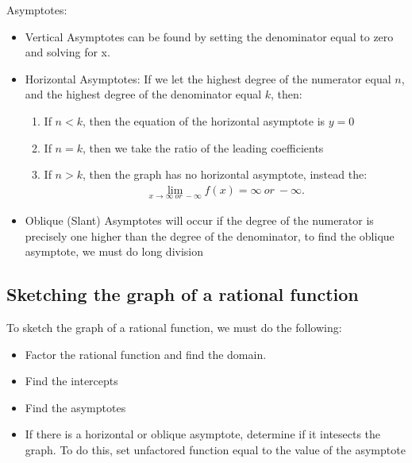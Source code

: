 \documentclass{report}
\begin{document}
    \bigbreak \noindent 
    Asymptotes:
    \begin{itemize}
      \item Vertical Asymptotes can be found by setting the denominator equal to zero and solving for x.
      \item Horizontal Asymptotes: If we let the highest degree of the numerator equal $n$, and the highest degree of the denominator equal $k$, then:
        \begin{enumerate}
          \item If $n < k$, then the equation of the horizontal asymptote is $y=0$
          \item If $n =k$, then we take the ratio of the leading coefficients
          \item If $n>k$, then the graph has no horizontal asymptote, instead the:
            \begin{align*}
               \lim\limits_{x \to \infty\ or\ -\infty}{f(x) = \infty\ or\ -\infty}
            .\end{align*}
        \end{enumerate}
      \item Oblique (Slant) Asymptotes will occur if the degree of the numerator is precisely one higher than the degree of the denominator, to find the oblique asymptote, we must do long division
    \end{itemize}

    \bigbreak \noindent \bigbreak \noindent 
    \subsection{Sketching the graph of a rational function}
    To sketch the graph of a rational function, we must do the following:
    \begin{itemize}
      \item Factor the rational function and find the domain.
      \item Find the intercepts 
      \item Find the asymptotes
      \item If there is a horizontal or oblique asymptote, determine if it intesects the graph. To do this, set unfactored function equal to the value of the asymptote
    \end{itemize}

    \bigbreak \noindent \bigbreak \noindent
\end{document}
